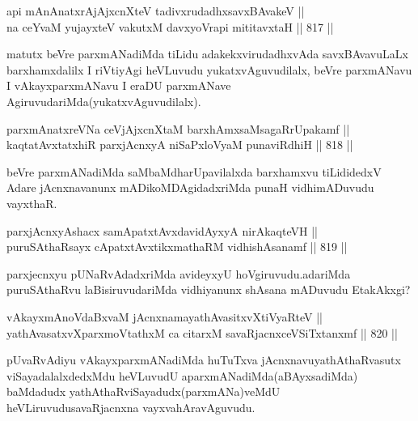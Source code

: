 \begin{shl}
api mAnAnatxrAjAjxcnXteV tadivxrudadhxsavxBAvakeV || \\
na ceYvaM yujayxteV vakutxM davxyoVrapi mititavxtaH \hfill || 817 ||  
\end{shl}

\begin{artha}
matutx beVre parxmANadiMda tiLidu adakekxvirudadhxvAda savxBAvavuLaLx barxhamxdalilx I riVtiyAgi heVLuvudu yukatxvAguvudilalx, beVre parxmANavu I vAkayxparxmANavu I eraDU parxmANave AgiruvudariMda(yukatxvAguvudilalx).
\end{artha}

\begin{shl}
parxmAnatxreVNa ceVjAjxcnXtaM barxhAmxsaMsagaRrUpakamf || \\
kaqtatAvxtatxhiR parxjAcnxyA niSaPxloV\s yaM punaviRdhiH \hfill || 818 ||  
\end{shl}

\begin{artha}
beVre parxmANadiMda saMbaMdharUpavilalxda barxhamxvu tiLididedxV Adare jAcnxnavanunx mADikoMDAgidadxriMda punaH vidhimADuvudu vayxthaR.
\end{artha}


\begin{shl}
parxjAcnxyAshacx samApatxtAvxdavidAyxyA nirAkaqteVH || \\
puruSAthaRsayx cA\s \s patxtAvxtikxmathaRM vidhishAsanamf \hfill || 819 ||  
\end{shl}

\begin{artha}
parxjecnxyu pUNaRvAdadxriMda avideyxyU hoVgiruvudu.\break adariMda puruSAthaRvu laBisiruvudariMda vidhiyanunx shAsana mADuvudu EtakAkxgi?
\end{artha}


\begin{shl}
vAkayxmAnoVdaBxvaM jAcnxnamayathAvasitxvXtiVyaRteV || \\
yathAvasatxvXparxmoVtathxM ca citarxM savaRjacnxceVSiTxtanxmf \hfill || 820 ||  
\end{shl}

\begin{artha}
pUvaRvAdiyu vAkayxparxmANadiMda huTuTxva jAcnxnavu\break yathAthaRvasutx viSayadalalxdedxMdu heVLuvudU aparxmANadiMda\break (aBAyxsadiMda) baMdadudx yathAthaRviSayadudx(parxmANa)veMdU heVLiruvudu\break savaRjacnxna vayxvahAravAguvudu.
\end{artha}

